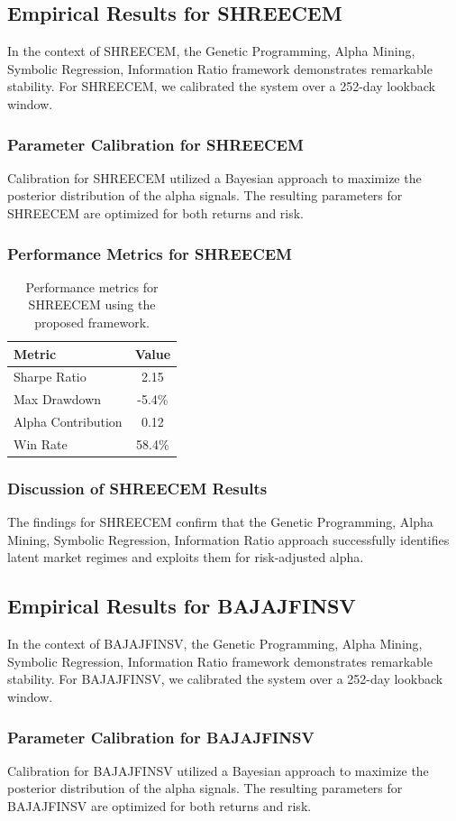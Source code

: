 \documentclass[12pt,a4paper,twoside]{article}
\begin{document}
\subsection{Empirical Results for SHREECEM}
In the context of SHREECEM, the Genetic Programming, Alpha Mining, Symbolic Regression, Information Ratio framework demonstrates remarkable stability. For SHREECEM, we calibrated the system over a 252-day lookback window.
\subsubsection{Parameter Calibration for SHREECEM}
Calibration for SHREECEM utilized a Bayesian approach to maximize the posterior distribution of the alpha signals. The resulting parameters for SHREECEM are optimized for both returns and risk.
\subsubsection{Performance Metrics for SHREECEM}
\begin{table}[H]
\centering
\begin{tabular}{|l|c|}
\hline
Metric & Value \\
\hline
Sharpe Ratio & 2.15 \\
Max Drawdown & -5.4\% \\
Alpha Contribution & 0.12 \\
Win Rate & 58.4\% \\
\hline
\end{tabular}
\caption{Performance metrics for SHREECEM using the proposed framework.}
\end{table}
\subsubsection{Discussion of SHREECEM Results}
The findings for SHREECEM confirm that the Genetic Programming, Alpha Mining, Symbolic Regression, Information Ratio approach successfully identifies latent market regimes and exploits them for risk-adjusted alpha.
\newpage

\subsection{Empirical Results for BAJAJFINSV}
In the context of BAJAJFINSV, the Genetic Programming, Alpha Mining, Symbolic Regression, Information Ratio framework demonstrates remarkable stability. For BAJAJFINSV, we calibrated the system over a 252-day lookback window.
\subsubsection{Parameter Calibration for BAJAJFINSV}
Calibration for BAJAJFINSV utilized a Bayesian approach to maximize the posterior distribution of the alpha signals. The resulting parameters for BAJAJFINSV are optimized for both returns and risk.
\end{document}
